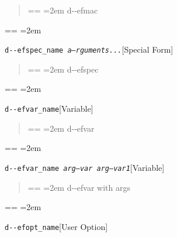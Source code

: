 \documentclass{book}
\makeatletter
\newenvironment{GNUTexinfopreformatted}{%
  \par\obeylines\obeyspaces\frenchspacing
  \parskip=\z@\parindent=\z@}{}
\makeatother
\begin{document}
%
\begin{quote}
\unskip{\parskip=0pt\noindent}%
\begin{GNUTexinfopreformatted}
\leftskip=2em\relax\ttfamily%
d{-}{-}efmac
\end{GNUTexinfopreformatted}
\end{quote}
\begin{GNUTexinfopreformatted}
\leftskip=2em\relax\ttfamily%

\end{GNUTexinfopreformatted}
\noindent\texttt{d{-}{-}efspec\_name \EmbracOn{}\textnormal{\textsl{a--rguments...}}\EmbracOff{}}\hfill[Special Form]

%
\begin{quote}
\unskip{\parskip=0pt\noindent}%
\begin{GNUTexinfopreformatted}
\leftskip=2em\relax\ttfamily%
d{-}{-}efspec
\end{GNUTexinfopreformatted}
\end{quote}
\begin{GNUTexinfopreformatted}
\leftskip=2em\relax\ttfamily%

\end{GNUTexinfopreformatted}
\noindent\texttt{d{-}{-}efvar\_name}\hfill[Variable]

%
\begin{quote}
\unskip{\parskip=0pt\noindent}%
\begin{GNUTexinfopreformatted}
\leftskip=2em\relax\ttfamily%
d{-}{-}efvar
\end{GNUTexinfopreformatted}
\end{quote}
\begin{GNUTexinfopreformatted}
\leftskip=2em\relax\ttfamily%

\end{GNUTexinfopreformatted}
\noindent\texttt{d{-}{-}efvar\_name \EmbracOn{}\textnormal{\textsl{arg--var arg--var1}}\EmbracOff{}}\hfill[Variable]

%
\begin{quote}
\unskip{\parskip=0pt\noindent}%
\begin{GNUTexinfopreformatted}
\leftskip=2em\relax\ttfamily%
d{-}{-}efvar with args
\end{GNUTexinfopreformatted}
\end{quote}
\begin{GNUTexinfopreformatted}
\leftskip=2em\relax\ttfamily%

\end{GNUTexinfopreformatted}
\noindent\texttt{d{-}{-}efopt\_name}\hfill[User Option]
\end{document}
